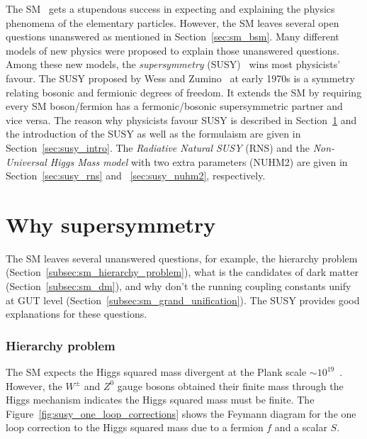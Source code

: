 The SM~\cite{Salam:1968rm, Glashow:1961tr, Weinberg:1967tq, Herrero:1998eq, Cottingham:2007zz} gets a stupendous success in expecting and explaining the physics phenomena of the elementary particles.
However, the SM leaves several open questions unanswered as mentioned in Section~\ref{sec:sm_bsm}.
Many different models of new physics were proposed to explain those unanswered questions.
Among these new models, the \textit{supersymmetry} (SUSY)~\cite{Wess:1974tw, Lykken:1996xt, Drees:1996ca, Martin:1997ns, Bilal:2001nv, Argyres:2001eva, Peskin:2008nw, Aitchison:2005cf, Shadmi:2017qdk} wins most physicists' favour.
The SUSY proposed by Wess and Zumino~\cite{Wess:1974tw} at early 1970s is a symmetry relating bosonic and fermionic degrees of freedom.
It extends the SM by requiring every SM boson/fermion has a fermonic/bosonic supersymmetric partner and vice versa.
The reason why physicists favour SUSY is described in Section~\ref{sec:susy_why_susy} and the introduction of the SUSY as well as the formulaism are given in Section~\ref{sec:susy_intro}.
The \textit{Radiative Natural SUSY} (RNS) and the \textit{Non-Universal Higgs Mass model} with two extra parameters (NUHM2) are given in Section~\ref{sec:susy_rns} and ~\ref{sec:susy_nuhm2}, respectively.


\section{Why supersymmetry}
\label{sec:susy_why_susy}
The SM leaves several unanswered questions, for example, the hierarchy problem (Section~\ref{subsec:sm_hierarchy_problem}), what is the candidates of dark matter (Section~\ref{subsec:sm_dm}), and why don't the running coupling constants unify at GUT level (Section~\ref{subsec:sm_grand_unification}).
The SUSY provides good explanations for these questions.


\subsubsection{Hierarchy problem}
\label{subsubsec:susy_hierarchy_problem}
The SM expects the Higgs squared mass divergent at the Plank scale $\sim 10^{19}$~{\GeV}.
However, the $W^{\pm}$ and $Z^{0}$ gauge bosons obtained their finite mass through the Higgs mechanism indicates the Higgs squared mass must be finite.
The Figure~\ref{fig:susy_one_loop_corrections} shows the Feymann diagram for the one loop correction to the Higgs squared mass due to a fermion $f$ and a scalar $S$.

